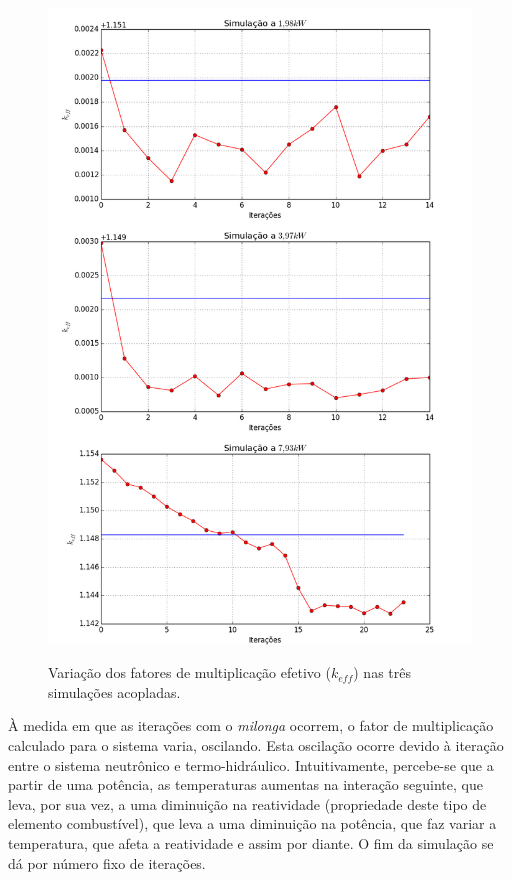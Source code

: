 \begin{figure}[htb]
  \caption{Variação dos fatores de multiplicação efetivo ($k_{eff}$) nas três simulações acopladas.}
  \centering\includegraphics[scale=0.5]{figuras/plot-vertical.png}
  \label{fig:keff_all}
\end{figure}

À medida em que as iterações com o \textit{milonga} ocorrem, o fator de multiplicação
calculado para o sistema varia, oscilando. Esta oscilação ocorre devido à iteração
entre o sistema neutrônico e termo-hidráulico. Intuitivamente, percebe-se que a partir
de uma potência, as temperaturas aumentas na interação seguinte, que leva, por sua vez,
a uma diminuição na reatividade (propriedade deste tipo de elemento combustível),
que leva a uma diminuição na potência, que faz variar a temperatura, que afeta
a reatividade e assim por diante. O fim da simulação se dá por número fixo
de iterações.

